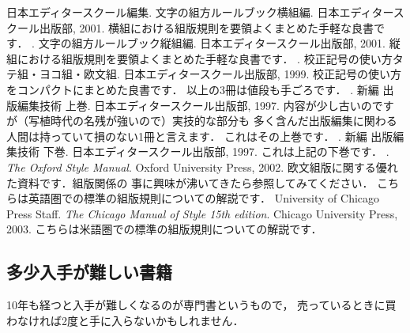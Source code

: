 \begin{myreferences}
%
%

  日本エディタースクール編集.  \newblock
  文字の組方ルールブック\zdash 横組編. 
  日本エディタースクール出版部, 2001. 
\sanko
 横組における組版規則を要領よくまとめた手軽な良書です．
%
  \iiiemdash.  \newblock
  文字の組方ルールブック\zdash 縦組編. 
  日本エディタースクール出版部, 2001. 
  \sanko
  縦組における組版規則を要領よくまとめた手軽な良書です．
%
  \iiiemdash.  \newblock
  校正記号の使い方\zdash タテ組・ヨコ組・欧文組.
  日本エディタースクール出版部, 1999. 
  \sanko
  校正記号の使い方をコンパクトにまとめた良書です．
  以上の3冊は値段も手ごろです．
% 
  \iiiemdash.  \newblock
  新編 出版編集技術 上巻. 
  日本エディタースクール出版部, 1997. 
  \sanko
  内容が少し古いのですが（写植時代の名残が強いので）実技的な部分も
  多く含んだ出版編集に関わる人間は持っていて損のない1冊と言えます．
  これはその上巻です．
%
  \iiiemdash.  \newblock
  新編 出版編集技術 下巻. 
  日本エディタースクール出版部, 1997. 
  \sanko
   これは上記の下巻です．
 . 
 {\em The Oxford Style Manual}. \newblock
 Oxford University Press, 2002.\sanko
欧文組版に関する優れた資料です．組版関係の
事に興味が沸いてきたら参照してみてください．
こちらは英語圏での標準の組版規則についての解説です．
 University of Chicago Press Staff.
 {\em The Chicago Manual of Style 15th edition}. \newblock
 Chicago University Press, 2003.\sanko
こちらは米語圏での標準の組版規則についての解説です．
% 
\end{myreferences}

\subsection{多少入手が難しい書籍}
10年も経つと入手が難しくなるのが専門書というもので，
売っているときに買わなければ2度と手に入らないかもしれません．

